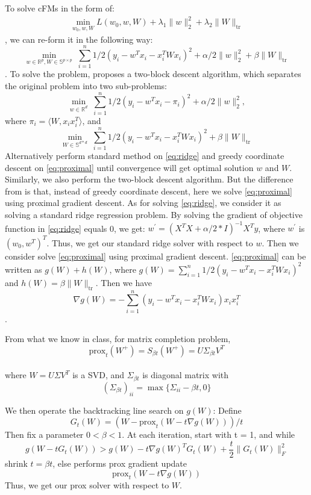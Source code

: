 \documentclass{article}
\newcommand{\tr}{\text{tr}}
\newcommand{\prox}{\text{prox}}
\begin{document}
To solve cFMs in the form of:
\begin{align*}
  \min_{w_0, w, W} L(w_0, w, W) + \lambda_1 \|w\|_2^2 + \lambda_2 \|W\|_{\tr}
\end{align*}
, we can re-form it in the following way:
\begin{equation}
\label{eq:eq5}
 \min_{w \in \mathbb{R}^{p}, W \in \mathbb{S}^{p \times p}} \;
\sum_{i = 1}^n 1/2(y_i-w^T x_i-x_i^T W x_i)^2 + \alpha /2 \|w\|_2^2 + \beta\|W\|_{\text{tr}}
\end{equation}
. To solve the problem, \cite{convexFM_paper} proposes a two-block descent algorithm, which separates the original problem into two sub-problems:
\begin{equation}
\label{eq:ridge}
 \min_{w \in \mathbb{R}^{d}} \;
\sum_{i = 1}^n 1/2(y_i-w^T x_i-\pi_i)^2 + \alpha /2 \|w\|_2^2,
\end{equation}
where $\pi_i=\langle W,x_i x_i^T\rangle$, and
\begin{equation}
\label{eq:proximal}
 \min_{W \in \mathbb{S}^{d*d}} \;
\sum_{i = 1}^n 1/2(y_i-w^T x_i-x_i^T W x_i)^2 + \beta\|W\|_{\text{tr}}
\end{equation}
Alternatively perform standard method on \cref{eq:ridge} and greedy coordinate descent on \cref{eq:proximal} until convergence will get optimal solution $w$ and $W$.
Similarly, we also perform the two-block descent algorithm. But the difference from \cite{convexFM_paper} is that, instead of greedy coordinate descent, here we solve \cref{eq:proximal} using proximal gradient descent. As for solving \cref{eq:ridge}, we consider it as solving a standard ridge regression problem.
By solving the gradient of objective function in \cref{eq:ridge} equals 0, we get: $w^\prime=(X^T X+\alpha/2*I)^{-1}X^T y$, where $w^\prime$ is $(w_0, w^T)^T$. Thus, we get our standard ridge solver with respect to $w$.
Then we consider solve \cref{eq:proximal} using proximal gradient descent. \cref{eq:proximal} can be written as $g(W)+h(W)$, where $g(W)=\sum_{i = 1}^n 1/2(y_i-w^T x_i-x_i^T W x_i)^2$ and
$h(W)=\beta\|W\|_{\text{tr}}$. Then we have
$$\nabla g(W)=-\sum_{i = 1}^n(y_i-w^T x_i-x_i^T W x_i)x_i x_i^T$$.
 
From what we know in class, for matrix completion problem,
$$\prox_t(W^{+})=S_{\beta t}(W^{+})=U\Sigma_{\beta t} V^T$$\\
where $W=U\Sigma V^T$ is a SVD, and $\Sigma_{\beta t}$ is diagonal matrix with $$(\Sigma_{\beta t})_{ii}=\max\{\Sigma_{ii}-\beta t,0\}$$
 
We then operate the backtracking line search on $g(W)$:
Define
$$G_t(W)=\left(W-\prox_t(W-t\nabla g(W))\right)/t$$
Then fix a parameter $0 <\beta < 1$. At each iteration, start with t = 1, and while
$$g(W-tG_t(W))>g(W)-t\nabla g(W)^T G_t(W)+\frac{t}{2}\|G_t(W)\|_F^2$$
shrink $t=\beta t$, else performs prox gradient update
$$\prox_t(W-t\nabla g(W))$$
Thus, we get our prox solver with respect to $W$.
 
\end{document}
